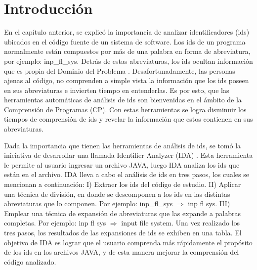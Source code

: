 \fancyhf{}
\pagestyle{fancy}
\lhead[]{\leftmark}
\chead[]{}
\rhead[]{\thepage}
\renewcommand{\headrulewidth}{1pt}

\section{Introducción}

En el capítulo anterior, se explicó la importancia de analizar identificadores (ids) ubicados en el código fuente de un sistema de software. Los ids de un programa normalmente están compuestos por más de una palabra en forma de abreviatura, por ejemplo: \textsf{inp\_fl\_sys}. Detrás de estas abreviaturas, los ids ocultan información que es propia del Dominio del Problema \cite{BCPT99,LFBEX07,EZH08,EHPV09}. Desafortunadamente, las personas ajenas al código, no comprenden a simple vista la información que los ids poseen en sus abreviaturas e invierten tiempo en entenderlas. Es por esto, que las herramientas automáticas de análisis de ids son bienvenidas en el ámbito de la Comprensión de Programas (CP). Con estas herramientas se logra disminuir los tiempos de comprensión de ids y revelar la información que estos contienen en sus abreviaturas.

Dada la importancia que tienen las herramientas de análisis de ids, se tomó la iniciativa de desarrollar una llamada Identifier Analyzer (IDA) \cite{AMGPM14}. Esta herramienta le permite al usuario ingresar un archivo JAVA, luego IDA analiza los ids que están en el archivo.
IDA lleva a cabo el análisis de ids en tres pasos, los cuales se mencionan a continuación: I) Extraer los ids del código de estudio. II) Aplicar una técnica de división, en donde se descomponen a los ids en las distintas abreviaturas que lo componen. Por ejemplo: \textsf{inp\_fl\_sys} $\Rightarrow$ \textsf{inp fl sys}. III) Emplear una técnica de expansión de abreviaturas que las expande a palabras completas. Por ejemplo: \textsf{inp fl sys} $\Rightarrow$ \textsf{input file system}. Una vez realizado los tres pasos, los resultados de las expansiones de ids se exhiben en una tabla.
El objetivo de IDA es lograr que el usuario comprenda más rápidamente el propósito de los ids en los archivos JAVA, y de esta manera mejorar la comprensión del código analizado.


